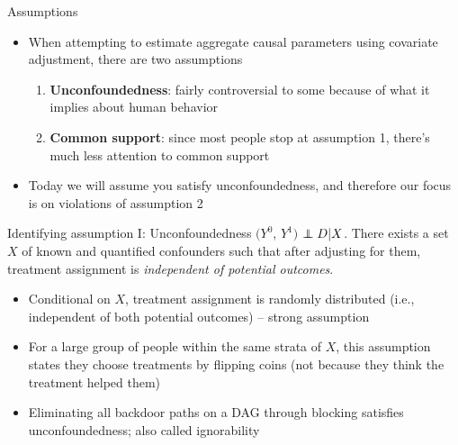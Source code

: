 \documentclass{beamer}
\newcommand\independent{\protect\mathpalette{\protect\independenT}{\perp}}
\def\independenT#1#2{\mathrel{\rlap{$#1#2$}\mkern2mu{#1#2}}}
\begin{document}
\begin{frame}{Assumptions}

\begin{itemize}

\item When attempting to estimate aggregate causal parameters using covariate adjustment, there are two assumptions

	\begin{enumerate}
	\item \textbf{Unconfoundedness}:  fairly controversial to some because of what it implies about human behavior
	\item \textbf{Common support}: since most people stop at assumption 1, there's much less attention to common support
	\end{enumerate}
\item Today we will assume you satisfy unconfoundedness, and therefore our focus is on violations of assumption 2
\end{itemize}

\end{frame}


\begin{frame}[plain]

	\begin{block}{Identifying assumption I: Unconfoundedness}
	$(Y^0$, $Y^1)$ $\independent{D} | X$. There exists a set $X$ of known and quantified confounders such that after adjusting for them, treatment assignment is \emph{independent of potential outcomes}.
	\end{block}
	
	\begin{itemize}
	\item Conditional on $X$, treatment assignment is randomly distributed (i.e., independent of both potential outcomes) -- strong assumption
	\item For a large group of people within the same strata of $X$, this assumption states they choose treatments by flipping coins (not because they think the treatment helped them)
	\item Eliminating all backdoor paths on a DAG through blocking satisfies unconfoundedness; also called ignorability
	\end{itemize}
\end{frame}
\end{document}
